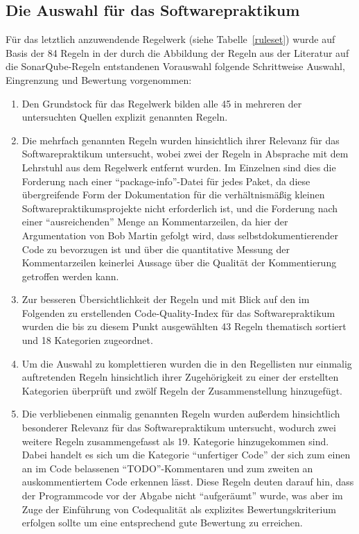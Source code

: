 \documentclass[da,ngerman]{stthesis}
\begin{document}
			\subsection{Die Auswahl für das Softwarepraktikum} \label{regelauswahlchapter}
				Für das letztlich anzuwendende Regelwerk (siehe Tabelle~\ref{ruleset}) wurde auf Basis der 84 Regeln in der durch die Abbildung der Regeln aus der Literatur auf die SonarQube-Regeln entstandenen Vorauswahl folgende Schrittweise Auswahl, Eingrenzung und Bewertung vorgenommen:
				\begin{enumerate}
					\item Den Grundstock für das Regelwerk bilden alle 45 in mehreren der untersuchten Quellen explizit genannten Regeln.
					\item Die mehrfach genannten Regeln wurden hinsichtlich ihrer Relevanz für das Softwarepraktikum untersucht, wobei zwei der Regeln in Absprache mit dem Lehrstuhl aus dem Regelwerk entfernt wurden. Im Einzelnen sind dies die Forderung nach einer "`package-info"'-Datei für jedes Paket, da diese übergreifende Form der Dokumentation für die verhältnismäßig kleinen Softwarepraktikumsprojekte nicht erforderlich ist, und die Forderung nach einer "`ausreichenden"' Menge an Kommentarzeilen, da hier der Argumentation von Bob Martin \cite{CleanCode} gefolgt wird, dass selbstdokumentierender Code zu bevorzugen ist und über die quantitative Messung der Kommentarzeilen keinerlei Aussage über die Qualität der Kommentierung getroffen werden kann.
					\item Zur besseren Übersichtlichkeit der Regeln und mit Blick auf den im Folgenden zu erstellenden Code-Quality-Index für das Softwarepraktikum wurden die bis zu diesem Punkt ausgewählten 43 Regeln thematisch sortiert und 18 Kategorien zugeordnet.
					\item Um die Auswahl zu komplettieren wurden die in den Regellisten nur einmalig auftretenden Regeln hinsichtlich ihrer Zugehörigkeit zu einer der erstellten Kategorien überprüft und zwölf Regeln der Zusammenstellung hinzugefügt.
					\item Die verbliebenen einmalig genannten Regeln wurden außerdem hinsichtlich besonderer Relevanz für das Softwarepraktikum untersucht, wodurch zwei weitere Regeln zusammengefasst als 19. Kategorie hinzugekommen sind. Dabei handelt es sich um die Kategorie "`unfertiger Code"' der sich zum einen an im Code belassenen "`TODO"'-Kommentaren und zum zweiten an auskommentiertem Code erkennen lässt. Diese Regeln deuten darauf hin, dass der Programmcode vor der Abgabe nicht "`aufgeräumt"' wurde, was aber im Zuge der Einführung von Codequalität als explizites Bewertungskriterium erfolgen sollte um eine entsprechend gute Bewertung zu erreichen.

\end{enumerate}
\end{document}
